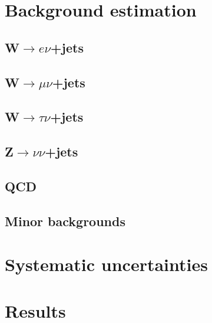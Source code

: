 
\section{Background estimation}%
\label{sec:promptbkg}

\subsection{W$\rightarrow e\nu$+jets}%
\label{sec:promptwenu}

\subsection{W$\rightarrow \mu\nu$+jets}%
\label{sec:promptwmunu}

\subsection{W$\rightarrow \tau\nu$+jets}%
\label{sec:promptwtaunu}

\subsection{Z$\rightarrow \nu\nu$+jets}%
\label{sec:promptznunu}

\subsection{QCD}%
\label{sec:promptQCD}

\subsection{Minor backgrounds}%
\label{sec:promptminor}

\section{Systematic uncertainties}%
\label{sec:promptsyst}

\section{Results}%
\label{sec:promptresults}
